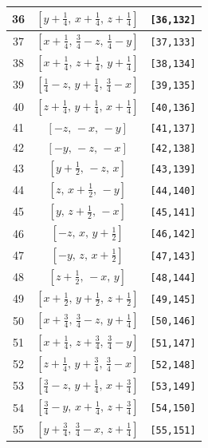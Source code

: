 \documentclass[fleqn,8pt]{jsarticle}
\begin{document}
\begin{longtable}{ccc}
36 & $\left[ y + \frac{1}{4},\, x + \frac{1}{4},\, z + \frac{1}{4} \right]$ & {\tt [36,132]} \\ \hline
37 & $\left[ x + \frac{1}{4},\, \frac{3}{4} - z,\, \frac{1}{4} - y \right]$ & {\tt [37,133]} \\ \hline
38 & $\left[ x + \frac{1}{4},\, z + \frac{1}{4},\, y + \frac{1}{4} \right]$ & {\tt [38,134]} \\ \hline
39 & $\left[ \frac{1}{4} - z,\, y + \frac{1}{4},\, \frac{3}{4} - x \right]$ & {\tt [39,135]} \\ \hline
40 & $\left[ z + \frac{1}{4},\, y + \frac{1}{4},\, x + \frac{1}{4} \right]$ & {\tt [40,136]} \\ \hline
41 & $\left[ - z,\, - x,\, - y \right]$ & {\tt [41,137]} \\ \hline
42 & $\left[ - y,\, - z,\, - x \right]$ & {\tt [42,138]} \\ \hline
43 & $\left[ y + \frac{1}{2},\, - z,\, x \right]$ & {\tt [43,139]} \\ \hline
44 & $\left[ z,\, x + \frac{1}{2},\, - y \right]$ & {\tt [44,140]} \\ \hline
45 & $\left[ y,\, z + \frac{1}{2},\, - x \right]$ & {\tt [45,141]} \\ \hline
46 & $\left[ - z,\, x,\, y + \frac{1}{2} \right]$ & {\tt [46,142]} \\ \hline
47 & $\left[ - y,\, z,\, x + \frac{1}{2} \right]$ & {\tt [47,143]} \\ \hline
48 & $\left[ z + \frac{1}{2},\, - x,\, y \right]$ & {\tt [48,144]} \\ \hline
49 & $\left[ x + \frac{1}{2},\, y + \frac{1}{2},\, z + \frac{1}{2} \right]$ & {\tt [49,145]} \\ \hline
50 & $\left[ x + \frac{3}{4},\, \frac{3}{4} - z,\, y + \frac{1}{4} \right]$ & {\tt [50,146]} \\ \hline
51 & $\left[ x + \frac{1}{4},\, z + \frac{3}{4},\, \frac{3}{4} - y \right]$ & {\tt [51,147]} \\ \hline
52 & $\left[ z + \frac{1}{4},\, y + \frac{3}{4},\, \frac{3}{4} - x \right]$ & {\tt [52,148]} \\ \hline
53 & $\left[ \frac{3}{4} - z,\, y + \frac{1}{4},\, x + \frac{3}{4} \right]$ & {\tt [53,149]} \\ \hline
54 & $\left[ \frac{3}{4} - y,\, x + \frac{1}{4},\, z + \frac{3}{4} \right]$ & {\tt [54,150]} \\ \hline
55 & $\left[ y + \frac{3}{4},\, \frac{3}{4} - x,\, z + \frac{1}{4} \right]$ & {\tt [55,151]} \\ \hline

\end{longtable}
\end{document}
